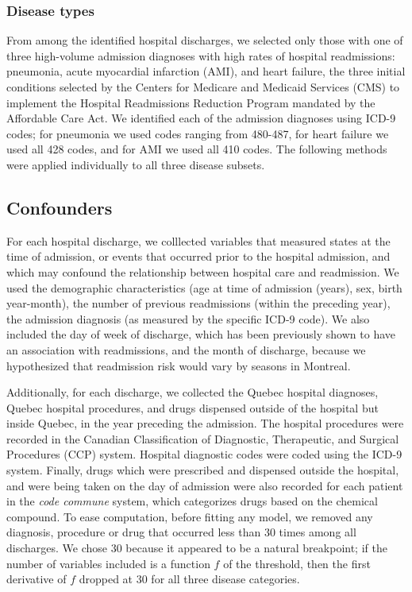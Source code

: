 \documentclass[]{article}\usepackage[]{graphicx}\usepackage[]{color}
\begin{document}
\subsubsection{Disease types}
From among the identified hospital discharges, we selected only those with one of three high-volume admission diagnoses with high rates of hospital readmissions: pneumonia, acute myocardial infarction (AMI), and heart failure, the three initial conditions selected by the Centers for Medicare and Medicaid Services (CMS) to implement the Hospital Readmissions Reduction Program mandated by the Affordable Care Act. We identified each of the admission diagnoses using ICD-9 codes; for pneumonia we used codes ranging from 480-487, for heart failure we used all 428 codes, and for AMI we used all 410 codes. The following methods were applied individually to all three disease subsets. 

\subsection{Confounders}
For each hospital discharge, we colllected variables that measured states at the time of admission, or events that occurred prior to the hospital admission, and which may confound the relationship between hospital care and readmission. We used the demographic characteristics (age at time of admission (years), sex, birth year-month), the number of previous readmissions (within the preceding year), the admission diagnosis (as measured by the specific ICD-9 code). We also included the day of week of discharge, which has been previously shown to have an association with readmissions\supercite{}, and the month of discharge, because we hypothesized that readmission risk would vary by seasons in Montreal.

Additionally, for each discharge, we collected the Quebec hospital diagnoses, Quebec hospital procedures, and drugs dispensed outside of the hospital but inside Quebec, in the year preceding the admission. The hospital procedures were recorded in the Canadian Classification of Diagnostic, Therapeutic, and Surgical Procedures (CCP) system. Hospital diagnostic codes were coded using the ICD-9 system. Finally, drugs which were prescribed and dispensed outside the hospital, and were being taken on the day of admission were also recorded for each patient in the \emph{code commune} system, which categorizes drugs based on the chemical compound. To ease computation, before fitting any model, we removed any diagnosis, procedure or drug that occurred less than 30 times among all discharges. We chose 30 because it appeared to be a natural breakpoint; if the number of variables included is a function $f$ of the threshold, then the first derivative of $f$ dropped at 30 for all three disease categories.
\end{document}
